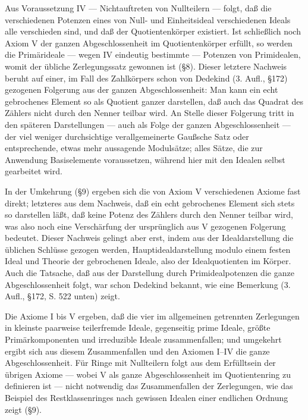 \documentclass[11pt]{article}
\begin{document}
Aus Voraussetzung IV — Nichtauftreten von Nullteilern — folgt, daß die
verschiedenen Potenzen eines von Null- und Einheitsideal verschiedenen Ideals alle
verschieden sind, und daß der Quotientenkörper existiert. Ist schließlich noch
Axiom V der ganzen Abgeschlossenheit im Quotientenkörper erfüllt, so werden die
Primärideale — wegen IV eindeutig bestimmte — Potenzen von Primidealen,
womit der übliche Zerlegungssatz gewonnen ist (§8). Dieser letztere Nachweis beruht
auf einer, im Fall des Zahlkörpers schon von Dedekind (3. Aufl., §172) gezogenen
Folgerung aus der ganzen Abgeschlossenheit: Man kann ein echt gebrochenes Element
so als Quotient ganzer darstellen, daß auch das Quadrat des Zählers nicht durch
den Nenner teilbar wird. An Stelle dieser Folgerung tritt in den späteren
Darstellungen — auch als Folge der ganzen Abgeschlossenheit — der viel weniger
durchsichtige verallgemeinerte Gaußsche Satz oder entsprechende, etwas mehr
aussagende Modulsätze; alles Sätze, die zur Anwendung Basiselemente voraussetzen,
während hier mit den Idealen selbst gearbeitet wird.

In der Umkehrung (§9) ergeben sich die von Axiom V verschiedenen Axiome fast
direkt; letzteres aus dem Nachweis, daß ein echt gebrochenes Element sich stets so
darstellen läßt, daß keine Potenz des Zählers durch den Nenner teilbar wird, was
also noch eine Verschärfung der ursprünglich aus V gezogenen Folgerung bedeutet.
Dieser Nachweis gelingt aber erst, indem aus der Idealdarstellung die üblichen
Schlüsse gezogen werden, Hauptidealdarstellung modulo einem festen Ideal und
Theorie der gebrochenen Ideale, also der Idealquotienten im Körper. Auch die
Tatsache, daß aus der Darstellung durch Primidealpotenzen die ganze
Abgeschlossenheit folgt, war schon Dedekind bekannt, wie eine Bemerkung
(3. Aufl., §172, S. 522 unten) zeigt.

Die Axiome I bis V ergeben, daß die vier im allgemeinen getrennten Zerlegungen
in kleinste paarweise teilerfremde Ideale, gegenseitig prime Ideale, größte
Primärkomponenten und irreduzible Ideale zusammenfallen; und umgekehrt ergibt
sich aus diesem Zusammenfallen und den Axiomen I--IV die ganze Abgeschlossenheit.
Für Ringe mit Nullteilern folgt aus dem Erfülltsein der übrigen Axiome — wobei
V als ganze Abgeschlossenheit im Quotientenring zu definieren ist — nicht notwendig
das Zusammenfallen der Zerlegungen, wie das Beispiel des Restklassenringes nach
gewissen Idealen einer endlichen Ordnung zeigt (§9).
\end{document}

